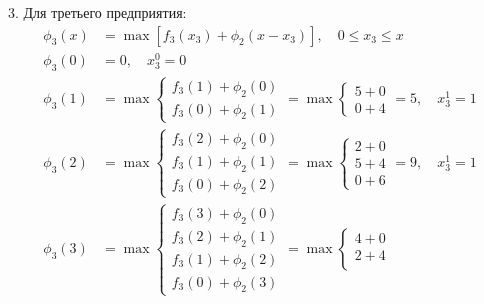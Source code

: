 \documentclass{article}
\begin{document}
3. Для третьего предприятия:
\[
    \begin{aligned}
        \phi_3(x) & = \max \left[ f_3(x_3) + \phi_2(x - x_3) \right], \quad 0 \leq x_3 \leq x \\
        \phi_3(0) & = 0, \quad x_3^0 = 0                                                      \\
        \phi_3(1) & = \max \begin{cases}
                               f_3(1) + \phi_2(0) \\
                               f_3(0) + \phi_2(1)
                           \end{cases} = \max \begin{cases}
                                                  5 + 0 \\
                                                  0 + 4
                                              \end{cases} = 5, \quad x_3^1 = 1                \\
        \phi_3(2) & = \max \begin{cases}
                               f_3(2) + \phi_2(0) \\
                               f_3(1) + \phi_2(1) \\
                               f_3(0) + \phi_2(2)
                           \end{cases} = \max \begin{cases}
                                                  2 + 0 \\
                                                  5 + 4 \\
                                                  0 + 6
                                              \end{cases} = 9, \quad x_3^1 = 1                \\
        \phi_3(3) & = \max \begin{cases}
                               f_3(3) + \phi_2(0) \\
                               f_3(2) + \phi_2(1) \\
                               f_3(1) + \phi_2(2) \\
                               f_3(0) + \phi_2(3)
                           \end{cases} = \max \begin{cases}
                                                  4 + 0 \\
                                                  2 + 4 \\

\end{cases}
\end{aligned}\]
\end{document}
